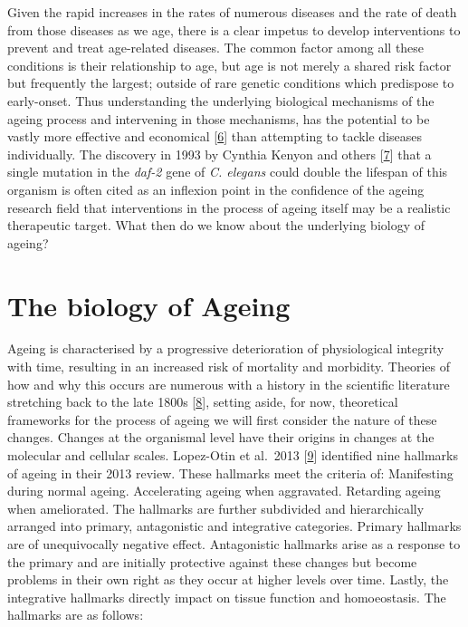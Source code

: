 \documentclass[
]{book}
\begin{document}
Given the rapid increases in the rates of numerous diseases and the rate of death from those diseases as we age, there is a clear impetus to develop interventions to prevent and treat age-related diseases.
The common factor among all these conditions is their relationship to age, but age is not merely a shared risk factor but frequently the largest; outside of rare genetic conditions which predispose to early-onset.
Thus understanding the underlying biological mechanisms of the ageing process and intervening in those mechanisms, has the potential to be vastly more effective and economical {[}\protect\hyperlink{ref-Goldman2016}{6}{]} than attempting to tackle diseases individually.
The discovery in 1993 by Cynthia Kenyon and others {[}\protect\hyperlink{ref-Kenyon1993}{7}{]} that a single mutation in the \emph{daf-2} gene of \emph{C. elegans} could double the lifespan of this organism is often cited as an inflexion point in the confidence of the ageing research field that interventions in the process of ageing itself may be a realistic therapeutic target. What then do we know about the underlying biology of ageing?

\hypertarget{the-biology-of-ageing}{%
\section{The biology of Ageing}\label{the-biology-of-ageing}}

Ageing is characterised by a progressive deterioration of physiological integrity with time, resulting in an increased risk of mortality and morbidity.
Theories of how and why this occurs are numerous with a history in the scientific literature stretching back to the late 1800s {[}\protect\hyperlink{ref-Medvedev1990}{8}{]}, setting aside, for now, theoretical frameworks for the process of ageing we will first consider the nature of these changes.
Changes at the organismal level have their origins in changes at the molecular and cellular scales. Lopez-Otin et al.~2013 {[}\protect\hyperlink{ref-Lopez-Otin2013}{9}{]} identified nine hallmarks of ageing in their 2013 review.
These hallmarks meet the criteria of:
Manifesting during normal ageing.
Accelerating ageing when aggravated.
Retarding ageing when ameliorated.
The hallmarks are further subdivided and hierarchically arranged into primary, antagonistic and integrative categories.
Primary hallmarks are of unequivocally negative effect.
Antagonistic hallmarks arise as a response to the primary and are initially protective against these changes but become problems in their own right as they occur at higher levels over time.
Lastly, the integrative hallmarks directly impact on tissue function and homoeostasis.
The hallmarks are as follows:
\end{document}
